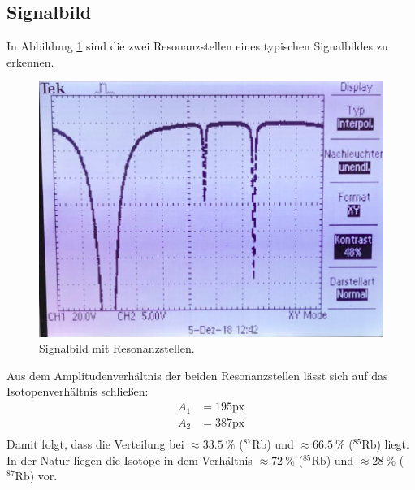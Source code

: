 \subsection{Signalbild}
In Abbildung \ref{abb:2} sind die zwei Resonanzstellen eines typischen Signalbildes
zu erkennen.

\begin{figure}
  \centering
  \includegraphics[scale=0.3]{Foto.png}
  \caption{Signalbild mit Resonanzstellen.}
  \label{abb:2}
\end{figure}

Aus dem Amplitudenverhältnis der beiden Resonanzstellen lässt sich auf das
Isotopenverhältnis schließen:
\begin{align*}
  A_1 &= 195\text{px} \\
  A_2 &= 387\text{px} \\
\end{align*}
Damit folgt, dass die Verteilung bei $\approx \SI{33,5}{\percent}$
($^{87}\text{Rb}$) und $\approx \SI{66,5}{\percent}$ ($^{85}\text{Rb}$) liegt.
In der Natur liegen die Isotope in dem
Verhältnis $\approx \SI{72}{\percent}$ ($^{85}\text{Rb}$) und
$\approx \SI{28}{\percent}$ ($^{87}\text{Rb}$) vor.

